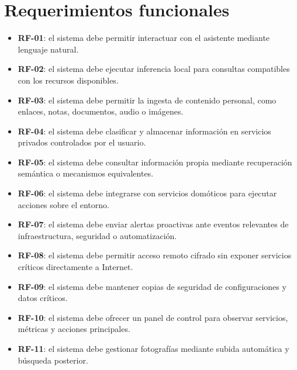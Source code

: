\section{Requerimientos funcionales}
\begin{itemize}
  \item \textbf{RF-01}: el sistema debe permitir interactuar con el asistente mediante lenguaje natural.
  \item \textbf{RF-02}: el sistema debe ejecutar inferencia local para consultas compatibles con los recursos disponibles.
  \item \textbf{RF-03}: el sistema debe permitir la ingesta de contenido personal, como enlaces, notas, documentos, audio o imágenes.
  \item \textbf{RF-04}: el sistema debe clasificar y almacenar información en servicios privados controlados por el usuario.
  \item \textbf{RF-05}: el sistema debe consultar información propia mediante recuperación semántica o mecanismos equivalentes.
  \item \textbf{RF-06}: el sistema debe integrarse con servicios domóticos para ejecutar acciones sobre el entorno.
  \item \textbf{RF-07}: el sistema debe enviar alertas proactivas ante eventos relevantes de infraestructura, seguridad o automatización.
  \item \textbf{RF-08}: el sistema debe permitir acceso remoto cifrado sin exponer servicios críticos directamente a Internet.
  \item \textbf{RF-09}: el sistema debe mantener copias de seguridad de configuraciones y datos críticos.
  \item \textbf{RF-10}: el sistema debe ofrecer un panel de control para observar servicios, métricas y acciones principales.
  \item \textbf{RF-11}: el sistema debe gestionar fotografías mediante subida automática y búsqueda posterior.
\end{itemize}

